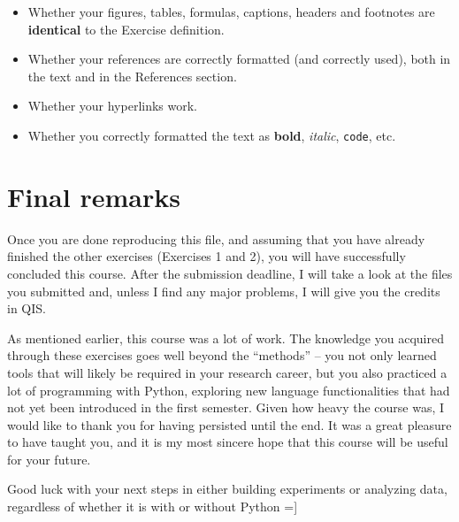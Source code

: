 \documentclass[11pt,a4paper]{scrartcl}
\begin{document}
\begin{itemize}
    \item Whether your figures, tables, formulas, captions, headers and footnotes are \textbf{identical} to the Exercise definition.
    \item Whether your references are correctly formatted (and correctly used), both in the text and in the References section.
    \item Whether your hyperlinks work.
    \item Whether you correctly formatted the text as \textbf{bold}, \textit{italic}, \texttt{code}, etc.
\end{itemize}

\section{Final remarks}
Once you are done reproducing this file, and assuming that you have already finished
the other exercises (Exercises 1 and 2), you will have successfully concluded this course.
After the submission deadline, I will take a look at the files you submitted and, unless I
find any major problems, I will give you the credits in QIS.


As mentioned earlier, this course was a lot of work. The knowledge you acquired
through these exercises goes well beyond the “methods” – you not only learned tools
that will likely be required in your research career, but you also practiced a lot of
programming with Python, exploring new language functionalities that had not yet
been introduced in the first semester. Given how heavy the course was, I would like to
thank you for having persisted until the end. It was a great pleasure to have taught you,
and it is my most sincere hope that this course will be useful for your future.


Good luck with your next steps in either building experiments or analyzing data,
regardless of whether it is with or without Python =]

\printbibliography[title={References}]
\label{References}
\end{document}
